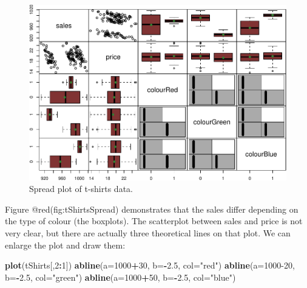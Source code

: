 \documentclass[
]{book}
\newenvironment{Shaded}{\begin{snugshade}}{\end{snugshade}}
\newcommand{\AttributeTok}[1]{\textcolor[rgb]{0.13,0.29,0.53}{#1}}
\newcommand{\DecValTok}[1]{\textcolor[rgb]{0.00,0.00,0.81}{#1}}
\newcommand{\FloatTok}[1]{\textcolor[rgb]{0.00,0.00,0.81}{#1}}
\newcommand{\FunctionTok}[1]{\textcolor[rgb]{0.13,0.29,0.53}{\textbf{#1}}}
\newcommand{\NormalTok}[1]{#1}
\newcommand{\SpecialCharTok}[1]{\textcolor[rgb]{0.81,0.36,0.00}{\textbf{#1}}}
\newcommand{\StringTok}[1]{\textcolor[rgb]{0.31,0.60,0.02}{#1}}
\theoremstyle{definition}
\theoremstyle{definition}
\theoremstyle{definition}
\theoremstyle{definition}
\theoremstyle{remark}
\begin{document}
\begin{figure}
\centering
\includegraphics{Svetunkov---Statistics-for-Business-Analytics_files/figure-latex/tShirtsSpread-1.pdf}
\caption{\label{fig:tShirtsSpread}Spread plot of t-shirts data.}
\end{figure}

Figure @red(fig:tShirtsSpread) demonstrates that the sales differ depending on the type of colour (the boxplots). The scatterplot between sales and price is not very clear, but there are actually three theoretical lines on that plot. We can enlarge the plot and draw them:

\begin{Shaded}
\begin{Highlighting}[]
\FunctionTok{plot}\NormalTok{(tShirts[,}\DecValTok{2}\SpecialCharTok{:}\DecValTok{1}\NormalTok{])}
\FunctionTok{abline}\NormalTok{(}\AttributeTok{a=}\DecValTok{1000}\SpecialCharTok{+}\DecValTok{30}\NormalTok{, }\AttributeTok{b=}\SpecialCharTok{{-}}\FloatTok{2.5}\NormalTok{, }\AttributeTok{col=}\StringTok{"red"}\NormalTok{)}
\FunctionTok{abline}\NormalTok{(}\AttributeTok{a=}\DecValTok{1000{-}20}\NormalTok{, }\AttributeTok{b=}\SpecialCharTok{{-}}\FloatTok{2.5}\NormalTok{, }\AttributeTok{col=}\StringTok{"green"}\NormalTok{)}
\FunctionTok{abline}\NormalTok{(}\AttributeTok{a=}\DecValTok{1000}\SpecialCharTok{+}\DecValTok{50}\NormalTok{, }\AttributeTok{b=}\SpecialCharTok{{-}}\FloatTok{2.5}\NormalTok{, }\AttributeTok{col=}\StringTok{"blue"}\NormalTok{)}
\end{Highlighting}
\end{Shaded}
\end{document}
